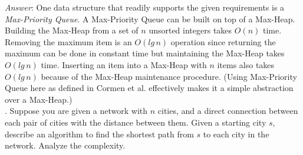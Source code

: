 \documentclass{scrartcl}
\begin{document}
    \noindent
    \textit{Answer}: One data structure that readily supports the given requirements is a
    \emph{Max-Priority Queue}. A Max-Priority Queue can be built on top of a Max-Heap. Building the
    Max-Heap from a set of $n$ unsorted integers takes $O(n)$ time. Removing the maximum item is an
    $O(lg\,n)$ operation since returning the maximum can be done in constant time but maintaining
    the Max-Heap takes $O(lg\,n)$ time. Inserting an item into a Max-Heap with $n$ items also takes
    $O(lg\,n)$ because of the Max-Heap maintenance procedure. (Using Max-Priority Queue here as
    defined in Cormen et al. effectively makes it a simple abstraction over a Max-Heap.)\\

    \bigskip
    . Suppose you are given a network with $n$ cities, and a direct connection between each pair of
    cities with the distance between them. Given a starting city $s$, describe an algorithm to find
    the shortest path from $s$ to each city in the network. Analyze the complexity.\\
\end{document}
